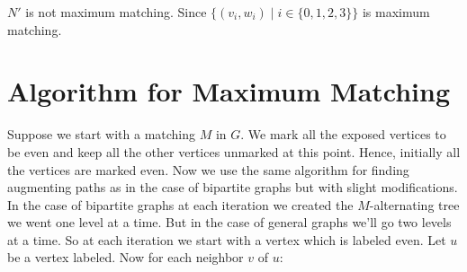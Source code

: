 $N'$ is not maximum matching. Since $\{(v_i,w_i)\mid i\in\{0,1,2,3\}\}$ is maximum matching.

\section{Algorithm for Maximum Matching}
Suppose we start with a matching $M$ in $G$. We mark all the exposed vertices to be even and keep all the other vertices unmarked at this point. Hence, initially all the vertices are marked even. Now we use the same algorithm for finding augmenting paths as in the case of bipartite graphs but with slight modifications. In the case of bipartite graphs at each iteration we created the $M$-alternating tree we went one level at a time. But in the case of general graphs we'll go two levels at a time. So at each iteration we start with a vertex which is labeled even. Let $u$ be a vertex labeled. Now for each neighbor $v$ of $u$:
